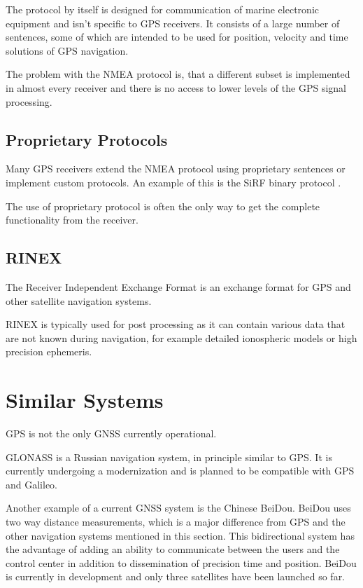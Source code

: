 The protocol by itself is designed for communication of marine electronic
equipment and isn't specific to GPS receivers.
It consists of a large number of sentences, some of which are intended to be used
for position, velocity and time solutions of GPS navigation.

The problem with the NMEA protocol is, that a different subset is implemented in almost every
receiver and there is no access to lower levels of the GPS signal processing.

\subsection{Proprietary Protocols}
Many GPS receivers extend the NMEA protocol using proprietary sentences or
implement custom protocols.
An example of this is the SiRF binary protocol \cite{sirf-protocol}.

The use of proprietary protocol is often the only way to get the complete functionality from
the receiver.

\subsection{RINEX}

The Receiver Independent Exchange Format \cite{rinex-format} is an exchange format
for GPS and other satellite navigation systems.

RINEX is typically used for post processing as it can contain various data that are not
known during navigation, for example detailed ionospheric models or high precision ephemeris.

\section{Similar Systems}

GPS is not the only GNSS currently operational.

GLONASS \cite{glonass} is a Russian navigation system, in principle similar to GPS.
It is currently undergoing a modernization and is planned to be compatible with GPS and Galileo.

Another example of a current GNSS system is the Chinese BeiDou.
BeiDou uses two way distance measurements, which is a major difference from GPS and the other navigation
systems mentioned in this section.
This bidirectional system has the advantage of adding an ability to communicate between the
users and the control center in addition to dissemination of precision time and position.
BeiDou is currently in development and only three satellites have been launched so far.


